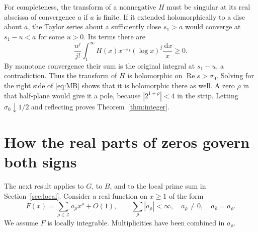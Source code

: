 \documentclass[11pt,a4paper]{article}
\newcommand{\Znt}{\mathcal Z}
\newcommand{\dd}{\,\mathrm d}
\newcommand{\Rea}{\operatorname{Re}}
\begin{document}
For completeness, the transform of a nonnegative $H$ must be singular at its real abscissa of convergence $a$ if $a$ is finite. If it extended holomorphically to a disc about $a$, the Taylor series about a sufficiently close $s_1>a$ would converge at $s_1-u<a$ for some $u>0$. Its terms there are
\[
 \frac{u^j}{j!}\int_1^\infty H(x)x^{-s_1}(\log x)^j\frac{\dd x}{x}\ge0.
\]
By monotone convergence their sum is the original integral at $s_1-u$, a contradiction. Thus the transform of $H$ is holomorphic on $\Rea s>\sigma_0$. Solving for the right side of \eqref{eq:MB} shows that it is holomorphic there as well. A zero $\rho$ in that half-plane would give it a pole, because $|2^{1+\rho}|<4$ in the strip. Letting $\sigma_0\downarrow1/2$ and reflecting proves Theorem~\ref{thm:integer}.

\section{How the real parts of zeros govern both signs}\label{sec:gaussian}
The next result applies to $G$, to $B$, and to the local prime sum in Section~\ref{sec:local}. Consider a real function on $x\ge1$ of the form
\begin{equation}\label{eq:class}
 F(x)=\sum_{\rho\in\Znt} a_\rho x^\rho+O(1),\qquad
 \sum_\rho|a_\rho|<\infty,\quad a_\rho\ne0,\quad
 a_{\bar\rho}=\overline{a_\rho}.
\end{equation}
We assume $F$ is locally integrable. Multiplicities have been combined in $a_\rho$.
\end{document}
